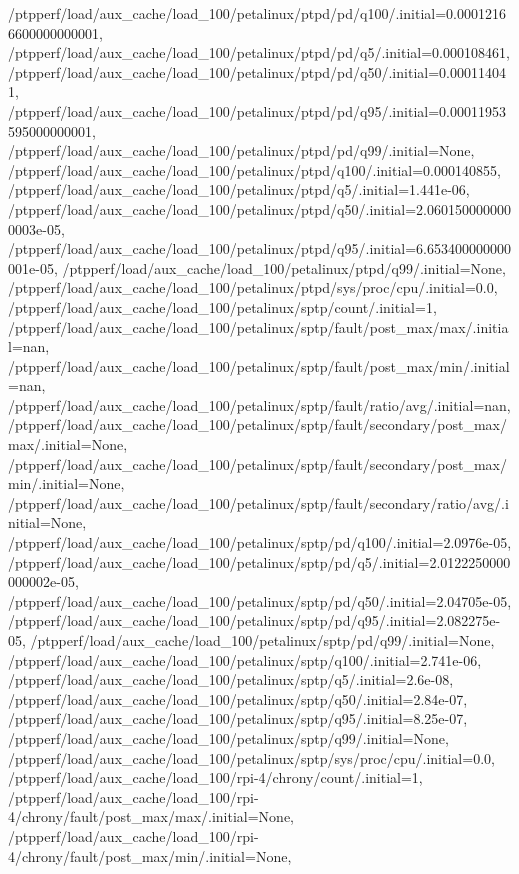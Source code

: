 {    /ptpperf/load/aux_cache/load_100/petalinux/ptpd/pd/q100/.initial=0.00012166600000000001,
    /ptpperf/load/aux_cache/load_100/petalinux/ptpd/pd/q5/.initial=0.000108461,
    /ptpperf/load/aux_cache/load_100/petalinux/ptpd/pd/q50/.initial=0.000114041,
    /ptpperf/load/aux_cache/load_100/petalinux/ptpd/pd/q95/.initial=0.00011953595000000001,
    /ptpperf/load/aux_cache/load_100/petalinux/ptpd/pd/q99/.initial=None,
    /ptpperf/load/aux_cache/load_100/petalinux/ptpd/q100/.initial=0.000140855,
    /ptpperf/load/aux_cache/load_100/petalinux/ptpd/q5/.initial=1.441e-06,
    /ptpperf/load/aux_cache/load_100/petalinux/ptpd/q50/.initial=2.0601500000000003e-05,
    /ptpperf/load/aux_cache/load_100/petalinux/ptpd/q95/.initial=6.653400000000001e-05,
    /ptpperf/load/aux_cache/load_100/petalinux/ptpd/q99/.initial=None,
    /ptpperf/load/aux_cache/load_100/petalinux/ptpd/sys/proc/cpu/.initial=0.0,
    /ptpperf/load/aux_cache/load_100/petalinux/sptp/count/.initial=1,
    /ptpperf/load/aux_cache/load_100/petalinux/sptp/fault/post_max/max/.initial=nan,
    /ptpperf/load/aux_cache/load_100/petalinux/sptp/fault/post_max/min/.initial=nan,
    /ptpperf/load/aux_cache/load_100/petalinux/sptp/fault/ratio/avg/.initial=nan,
    /ptpperf/load/aux_cache/load_100/petalinux/sptp/fault/secondary/post_max/max/.initial=None,
    /ptpperf/load/aux_cache/load_100/petalinux/sptp/fault/secondary/post_max/min/.initial=None,
    /ptpperf/load/aux_cache/load_100/petalinux/sptp/fault/secondary/ratio/avg/.initial=None,
    /ptpperf/load/aux_cache/load_100/petalinux/sptp/pd/q100/.initial=2.0976e-05,
    /ptpperf/load/aux_cache/load_100/petalinux/sptp/pd/q5/.initial=2.0122250000000002e-05,
    /ptpperf/load/aux_cache/load_100/petalinux/sptp/pd/q50/.initial=2.04705e-05,
    /ptpperf/load/aux_cache/load_100/petalinux/sptp/pd/q95/.initial=2.082275e-05,
    /ptpperf/load/aux_cache/load_100/petalinux/sptp/pd/q99/.initial=None,
    /ptpperf/load/aux_cache/load_100/petalinux/sptp/q100/.initial=2.741e-06,
    /ptpperf/load/aux_cache/load_100/petalinux/sptp/q5/.initial=2.6e-08,
    /ptpperf/load/aux_cache/load_100/petalinux/sptp/q50/.initial=2.84e-07,
    /ptpperf/load/aux_cache/load_100/petalinux/sptp/q95/.initial=8.25e-07,
    /ptpperf/load/aux_cache/load_100/petalinux/sptp/q99/.initial=None,
    /ptpperf/load/aux_cache/load_100/petalinux/sptp/sys/proc/cpu/.initial=0.0,
    /ptpperf/load/aux_cache/load_100/rpi-4/chrony/count/.initial=1,
    /ptpperf/load/aux_cache/load_100/rpi-4/chrony/fault/post_max/max/.initial=None,
    /ptpperf/load/aux_cache/load_100/rpi-4/chrony/fault/post_max/min/.initial=None,
}
